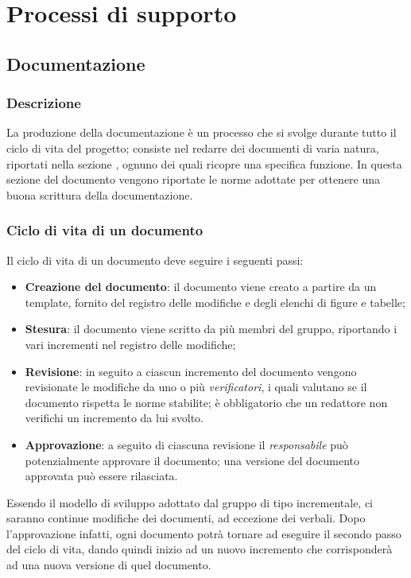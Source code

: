 \section{Processi di supporto}
\label{sec:processi_di_supporto}

\subsection{Documentazione}
\label{sub:doc}

\subsubsection{Descrizione}
\label{ssub:documentazione:descrizione}

La produzione della documentazione è un processo che si svolge durante tutto il ciclo di vita del progetto; consiste nel redarre dei
documenti di varia natura, riportati nella sezione , ognuno dei quali ricopre una specifica funzione. In
questa sezione del documento vengono riportate le norme adottate per ottenere una buona scrittura della documentazione.

\subsubsection{Ciclo di vita di un documento}
\label{ssub:ciclo_vita_doc}

Il ciclo di vita di un documento deve seguire i seguenti passi:
\begin{itemize}
    \item \textbf{Creazione del documento}: il documento viene creato a partire da un template, fornito del registro delle
    	modifiche e degli elenchi di figure e tabelle;
    \item \textbf{Stesura}: il documento viene scritto da più membri del gruppo, riportando i vari incrementi nel registro delle modifiche;
    \item \textbf{Revisione}: in seguito a ciascun incremento del documento vengono revisionate le modifiche da uno o più
    	\emph{verificatori}, i quali valutano se il documento rispetta le norme stabilite; \`{e} obbligatorio che un redattore non verifichi
    	un incremento da lui svolto.
    \item \textbf{Approvazione}: a seguito di ciascuna revisione il \emph{responsabile} pu\`{o} potenzialmente approvare il documento; una
    	versione del documento approvata pu\`{o} essere rilasciata.
\end{itemize}
Essendo il modello di sviluppo adottato dal gruppo di tipo incrementale, ci saranno continue modifiche dei documenti, ad eccezione dei verbali.
Dopo l'approvazione infatti, ogni documento potrà tornare ad eseguire il secondo passo del ciclo di vita, dando quindi inizio ad un nuovo
incremento che corrisponderà ad una nuova versione di quel documento.

